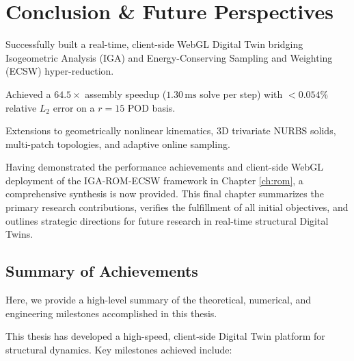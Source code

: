 \chapter{Conclusion \& Future Perspectives}
\label{ch:conclusion}

\begin{tcolorbox}[colback=lightbg, colframe=primaryblue, title=\textbf{Chapter at a Glance: Achievements \& Research Impact}, fonttitle=\bfseries]
    \begin{description}[leftmargin=!, labelwidth=3.4cm]
        \item[\textbf{Core Result}] Successfully built a real-time, client-side WebGL Digital Twin bridging Isogeometric Analysis (IGA) and Energy-Conserving Sampling and Weighting (ECSW) hyper-reduction.
        \item[\textbf{Speedup \& Accuracy}] Achieved a $64.5\times$ assembly speedup ($1.30\,\text{ms}$ solve per step) with $<0.054\%$ relative $L_2$ error on a $r=15$ POD basis.
        \item[\textbf{Future Horizons}] Extensions to geometrically nonlinear kinematics, 3D trivariate NURBS solids, multi-patch topologies, and adaptive online sampling.
    \end{description}
\end{tcolorbox}

Having demonstrated the performance achievements and client-side WebGL deployment of the IGA-ROM-ECSW framework in Chapter \ref{ch:rom}, a comprehensive synthesis is now provided. This final chapter summarizes the primary research contributions, verifies the fulfillment of all initial objectives, and outlines strategic directions for future research in real-time structural Digital Twins.

\section{Summary of Achievements}

Here, we provide a high-level summary of the theoretical, numerical, and engineering milestones accomplished in this thesis.

This thesis has developed a high-speed, client-side Digital Twin platform for structural dynamics. Key milestones achieved include:

